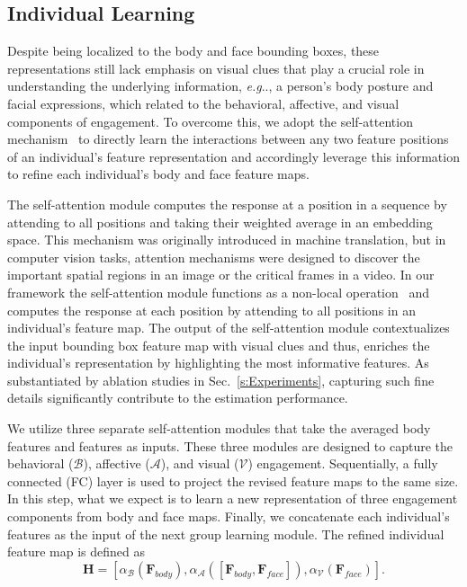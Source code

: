 \documentclass[10pt,journal,compsoc]{IEEEtran}
\makeatletter
\DeclareRobustCommand\onedot{\futurelet\@let@token\@onedot}
\def\@onedot{\ifx\@let@token.\else.\null\fi\xspace}
\def\eg{\emph{e.g}\onedot} \def\Eg{\emph{E.g}\onedot}
\makeatother
\begin{document}
\subsection{Individual Learning}
\label{subs:Individual_Learning}

Despite being localized to the body and face bounding boxes, these representations still lack emphasis on visual clues that play a crucial role in understanding the underlying information, \eg, a person's body posture and facial expressions, which related to the behavioral, affective, and visual components of engagement. To overcome this, we adopt the self-attention mechanism~\cite{Vaswani2017Attention} to directly learn the interactions between any two feature positions of an individual's feature representation and accordingly leverage this information to refine each individual's body and face feature maps.

The self-attention module computes the response at a position in a sequence by attending to all positions and taking their weighted average in an embedding space. This mechanism was originally introduced in machine translation, but in computer vision tasks, attention mechanisms were designed to discover the important spatial regions in an image or the critical frames in a video. In our framework the self-attention module functions as a non-local operation~\cite{Wang2018NonLocal} and computes the response at each position by attending to all positions in an individual's feature map. The output of the self-attention module contextualizes the input bounding box feature map with visual clues and thus, enriches the individual's representation by highlighting the most informative features. As substantiated by ablation studies in Sec.~\ref{s:Experiments}, capturing such fine details significantly contribute to the estimation performance.

We utilize three separate self-attention modules that take the averaged body features and features as inputs. These three modules are designed to capture the behavioral ($\mathcal{B}$), affective ($\mathcal{A}$), and visual ($\mathcal{V}$) engagement. Sequentially, a fully connected (FC) layer is used to project the revised feature maps to the same size. In this step, what we expect is to learn a new representation of three engagement components from body and face maps. Finally, we concatenate each individual's features as the input of the next group learning module. The refined individual feature map is defined as
\begin{equation}
  \mathbf{H} = \left[\alpha_{\mathcal{B}}\left({\mathbf{F}_{body}}\right), \alpha_{\mathcal{A}}\left(\left[{\mathbf{F}_{body}}, {\mathbf{F}_{face}}\right]\right), \alpha_{\mathcal{V}}\left({\mathbf{F}_{face}}\right)\right].
\end{equation}
\end{document}
